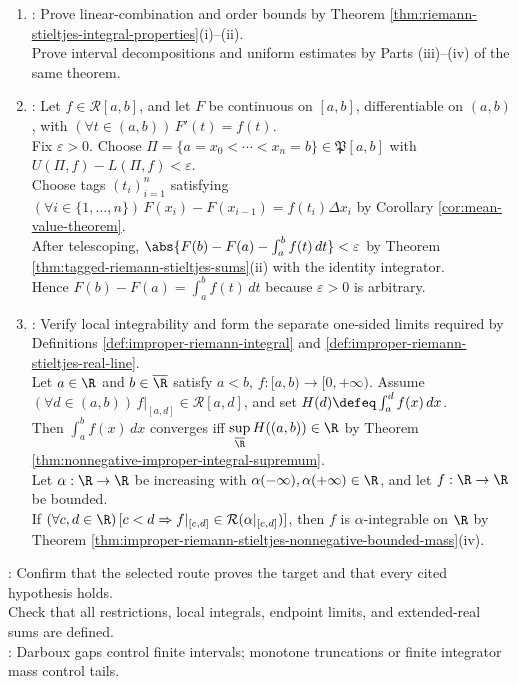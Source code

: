\begin{proofmethod}
\begin{enumerate}[label=(\roman*)]
On $K\defeq[a,b]\setminus\bigcup\limits_{j=1}^{N}\operatorname{int}_{[a,b]}J_j$, control the remaining gap by uniform continuity of $f|_K$.
\item {}: Prove linear-combination and order bounds by Theorem \ref{thm:riemann-stieltjes-integral-properties}(i)--(ii).\\
Prove interval decompositions and uniform estimates by Parts (iii)--(iv) of the same theorem.
\item {}: Let $f\in\mathcal{R}[a,b]$, and let $F$ be continuous on $[a,b]$, differentiable on $(a,b)$, with $(\forall t\in(a,b))\,F'(t)=f(t)$.\\
Fix $\varepsilon>0$. Choose $\Pi=\{a=x_0<\cdots<x_n=b\}\in\mathfrak{P}[a,b]$ with $U(\Pi,f)-L(\Pi,f)<\varepsilon$.\\
Choose tags $(t_i)_{i=1}^{n}$ satisfying $(\forall i\in\{1,\ldots,n\})\,F(x_i)-F(x_{i-1})=f(t_i)\Delta x_i$ by Corollary \ref{cor:mean-value-theorem}.\\
After telescoping, $\abs{F(b)-F(a)-\int_a^b f(t)\,dt}<\varepsilon$ by Theorem \ref{thm:tagged-riemann-stieltjes-sums}(ii) with the identity integrator.\\
Hence $F(b)-F(a)=\int_a^b f(t)\,dt$ because $\varepsilon>0$ is arbitrary.
\item {}: Verify local integrability and form the separate one-sided limits required by Definitions \ref{def:improper-riemann-integral} and \ref{def:improper-riemann-stieltjes-real-line}.\\
Let $a\in\R$ and $b\in\overline{\R}$ satisfy $a<b$, $f:[a,b)\to[0,+\infty)$. Assume $(\forall d\in(a,b))\,f|_{[a,d]}\in\mathcal{R}[a,d]$, and set $H(d)\defeq\int_a^d f(x)\,dx$.\\
Then $\int_a^b f(x)\,dx$ converges iff $\sup\limits_{\overline{\R}}H((a,b))\in\R$ by Theorem \ref{thm:nonnegative-improper-integral-supremum}.\\
Let $\alpha:\R\to\R$ be increasing with $\alpha(-\infty),\alpha(+\infty)\in\R$, and let $f:\R\to\R$ be bounded.\\
If $(\forall c,d\in\R)\,[c<d\Rightarrow f|_{[c,d]}\in\mathcal{R}(\alpha|_{[c,d]})]$, then $f$ is $\alpha$-integrable on $\R$ by Theorem \ref{thm:improper-riemann-stieltjes-nonnegative-bounded-mass}(iv).
\end{enumerate}
: Confirm that the selected route proves the target and that every cited hypothesis holds.\\
Check that all restrictions, local integrals, endpoint limits, and extended-real sums are defined.\\
: Darboux gaps control finite intervals; monotone truncations or finite integrator mass control tails.
\end{proofmethod}
